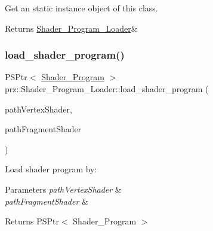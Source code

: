 Get an static instance object of this class. 

\begin{DoxyReturn}{Returns}
\mbox{\hyperlink{classprz_1_1_shader___program___loader}{Shader\+\_\+\+Program\+\_\+\+Loader}}\& 
\end{DoxyReturn}
\mbox{\label{classprz_1_1_shader___program___loader_a30e0a0233aaecaef88771c0cbd6bf34d}} 
\subsubsection{\texorpdfstring{load\_shader\_program()}{load\_shader\_program()}\hspace{0.1cm}{\footnotesize\ttfamily [1/4]}}
{\footnotesize\ttfamily P\+S\+Ptr$<$ \mbox{\hyperlink{classprz_1_1_shader___program}{Shader\+\_\+\+Program}} $>$ prz\+::\+Shader\+\_\+\+Program\+\_\+\+Loader\+::load\+\_\+shader\+\_\+program (\begin{DoxyParamCaption}\item[{const P\+String \&}]{path\+Vertex\+Shader,  }\item[{const P\+String \&}]{path\+Fragment\+Shader }\end{DoxyParamCaption})\hspace{0.3cm}{\ttfamily [inline]}}



Load shader program by\+: 


\begin{DoxyParams}{Parameters}
{\em path\+Vertex\+Shader} & \\
\hline
{\em path\+Fragment\+Shader} & \\
\hline
\end{DoxyParams}
\begin{DoxyReturn}{Returns}
P\+S\+Ptr$<$ Shader\+\_\+\+Program $>$ 
\end{DoxyReturn}
\mbox{\label{classprz_1_1_shader___program___loader_aa5dd051be718aba2a19c66b2e7e6d55d}} 
